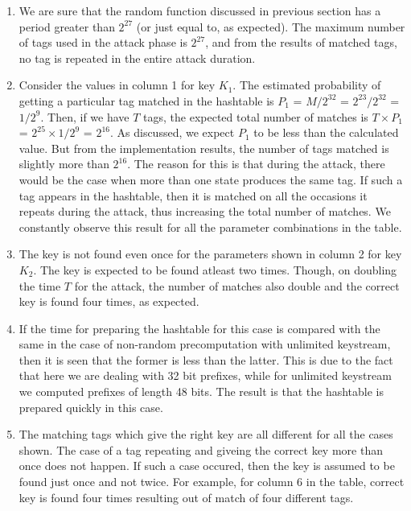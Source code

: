 \begin{enumerate}
\item We are sure that the random function discussed in previous section has a period greater than $2^{27}$ (or just equal to, as expected). The maximum number of tags used in the attack phase is $2^{27}$, and from the results of matched tags, no tag is repeated in the entire attack duration. 

\item Consider the values in column 1 for key $K_1$. The estimated probability of getting a particular tag matched in the hashtable is $P_1$ = $M/2^{32}$ = $2^{23}/2^{32}$ = $1/2^{9}$. Then, if we have $T$ tags, the expected total number of matches is $T \times P_1$ = $2^{25} \times 1/2^{9}$ = $2^{16}$. As discussed, we expect $P_1$ to be less than the calculated value. But from the implementation results, the number of tags matched is slightly more than $2^{16}$. The reason for this is that during the attack, there would be the case when more than one state produces the same tag. If such a tag appears in the hashtable, then it is matched on all the occasions it repeats during the attack, thus increasing the total number of matches. We constantly observe this result for all the parameter combinations in the table. 

\item The key is not found even once for the parameters shown in column 2 for key $K_2$. The key is expected to be found atleast two times. Though, on doubling the time $T$ for the attack, the number of matches also double and the correct key is found four times, as expected. 

\item If the time for preparing the hashtable for this case is compared with the same in the case of non-random precomputation with unlimited keystream, then it is seen that the former is less than the latter. This is due to the fact that here we are dealing with 32 bit prefixes, while for unlimited keystream we computed prefixes of length 48 bits. The result is that the hashtable is prepared quickly in this case. 

\item The matching tags which give the right key are all different for all the cases shown. The case of a tag repeating and giveing the correct key more than once does not happen. If such a case occured, then the key is assumed to be found just once and not twice. For example, for column 6 in the table, correct key is found four times resulting out of match of four different tags.
\end{enumerate}